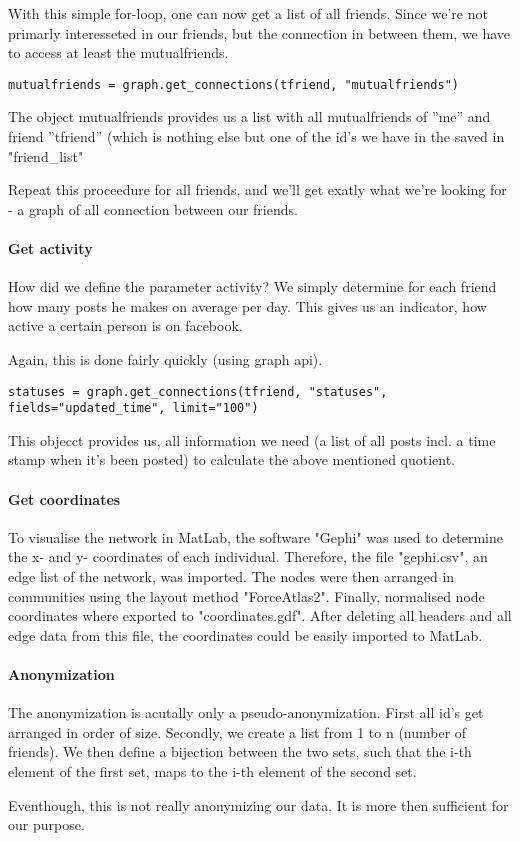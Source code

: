With this simple for-loop, one can now get a list of all friends. Since we're not primarly interesseted in our friends, but the connection in between them, we have to access at least the mutualfriends. 

\begin{lstlisting}
mutualfriends = graph.get_connections(tfriend, "mutualfriends")
\end{lstlisting}

The object mutualfriends provides us a list with all mutualfriends of ''me'' and friend ''tfriend'' (which is nothing else but one of the id's we have in the saved in "friend\_list"

Repeat this proceedure for all friends, and we'll get exatly what we're looking for - a graph of all connection between our friends.

\paragraph{Get activity}

How did we define the parameter activity? We simply determine for each friend how many posts he makes on average per day. This gives us an indicator, how active a certain person is on facebook. 

Again, this is done fairly quickly (using graph api).

\begin{lstlisting}
statuses = graph.get_connections(tfriend, "statuses", fields="updated_time", limit="100")
\end{lstlisting}

This objecct provides us, all information we need (a list of all posts incl. a time stamp when it's been posted) to calculate the above mentioned quotient.

\paragraph{Get coordinates}
To visualise the network in MatLab, the software "Gephi" was used to determine the x- and y- coordinates of each individual. Therefore, the file "gephi.csv", an edge list of the network, was imported. The nodes were then arranged in communities using the layout method "ForceAtlas2". Finally, normalised node coordinates where exported to "coordinates.gdf". After deleting all headers and all edge data from this file, the coordinates could be easily imported to MatLab.

\paragraph{Anonymization}

The anonymization is acutally only a pseudo-anonymization. First all id's get arranged in order of size. Secondly, we create a list from 1 to n (number of friends). We then define a bijection between the two sets, such that the i-th element of the first set, maps to the i-th element of the second set. 

Eventhough, this is not really anonymizing our data. It is more then sufficient for our purpose. 




